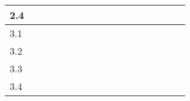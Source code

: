\begin{table}[H]
{\begin{tabular}{|l|l|l|l|l|l|l|l|l|l|l|l|l|l|l|l|l|}
2.4       &                          & \cellcolor[HTML]{000000}                        &                          &                          &                          &                          &                          &                          &                                                 &                                                 &                                                 &                          &                          &                          &                          &                          \\ \hline
3.1       &                          &                                                 & \cellcolor[HTML]{000000} &                          &                          &                          &                          &                          &                                                 &                                                 &                                                 &                          &                          &                          &                          &                          \\ \hline
3.2       &                          &                                                 & \cellcolor[HTML]{000000} &                          &                          &                          &                          &                          &                                                 &                                                 &                                                 &                          &                          &                          &                          &                          \\ \hline
3.3       &                          &                                                 & \cellcolor[HTML]{000000} & \cellcolor[HTML]{000000} & \cellcolor[HTML]{000000} & \cellcolor[HTML]{000000} &                          &                          &                                                 &                                                 &                                                 &                          &                          &                          &                          &                          \\ \hline
3.4       &                          &                                                 & \cellcolor[HTML]{000000} & \cellcolor[HTML]{000000} & \cellcolor[HTML]{000000} & \cellcolor[HTML]{000000} &                          &                          &                                                 &                                                 &                                                 &                          &                          &                          &                          &                          \\ \hline

\end{tabular}}
\end{table}
